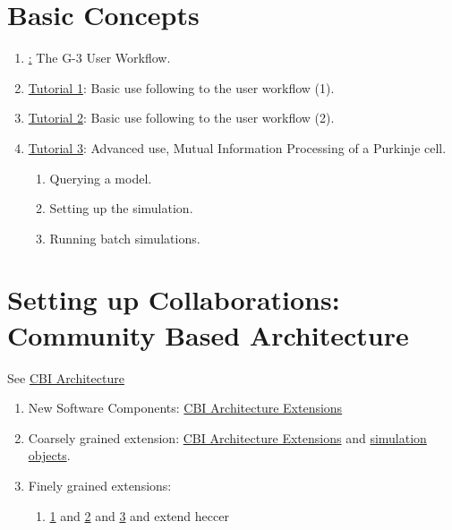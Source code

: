 \documentclass[12pt]{article}
\begin{document}
\section{Basic Concepts}

\begin{enumerate}
\item \href{../workflow-user/workflow-user.tex}: The G-3 User Workflow.
\item \href{../tutorial1/tutorial1.tex}{Tutorial 1}: Basic use following to the user workflow (1).
\item \href{../tutorial2/tutorial2.tex}{Tutorial 2}: Basic use following to the user workflow (2).
\item \href{../tutorial3/tutorial3.tex}{Tutorial 3}: Advanced use,
  Mutual Information Processing of a Purkinje cell.
  \begin{enumerate}
  \item Querying a model.
  \item Setting up the simulation.
  \item Running batch simulations.
  \end{enumerate}
\end{enumerate}

\section{Setting up Collaborations: Community Based Architecture}

See \href{../genesis-overview/genesis-overview.tex}{CBI Architecture}

\begin{enumerate}
\item New Software Components:
  \href{../genesis-addto-component-developerpackage/genesis-addto-component-developerpackage.tex}{CBI
    Architecture Extensions}
\item Coarsely grained extension:
  \href{../genesis-add-feature-ssp/genesis-add-feature-ssp.tex}{CBI
    Architecture Extensions} and
  \href{../genesis-add-object-solver/genesis-add-object-solver.tex}{simulation
    objects}.
\item Finely grained extensions:
  \begin{enumerate}
  \item
    \href{../genesis-extend-model-container/genesis-extend-model-container.tex}{1}
    and
    \href{../genesis-extend-model-container-detail/genesis-extend-model-container-detail.tex}{2}
    and
    \href{../genesis-extend-functionality/genesis-extend-functionality.tex}{3}
    and extend heccer
  \end{enumerate}
\end{enumerate}
\end{document}
